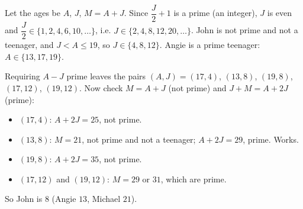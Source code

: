 Let the ages be $A$, $J$, $M=A+J$. Since $\dfrac {J}{2}+1$ is a prime (an integer), $J$ is even and $\dfrac {J}{2}\in\{1,2,4,6,10,\dots\}$, i.e. $J\in\{2,4,8,12,20,\dots\}$. John is not prime and not a teenager, and $J<A\le19$, so $J\in\{4,8,12\}$. Angie is a prime teenager: $A\in\{13,17,19\}$.

Requiring $A-J$ prime leaves the pairs $(A,J)=(17,4)$, $(13,8)$, $(19,8)$, $(17,12)$, $(19,12)$. Now check $M=A+J$ (not prime) and $J+M=A+2J$ (prime):
\begin{itemize}
\item $(17,4)$: $A+2J=25$, not prime.
\item $(13,8)$: $M=21$, not prime and not a teenager; $A+2J=29$, prime. Works.
\item $(19,8)$: $A+2J=35$, not prime.
\item $(17,12)$ and $(19,12)$: $M=29$ or $31$, which are prime.
\end{itemize}
So John is $\boxed{8}$ (Angie $13$, Michael $21$).
